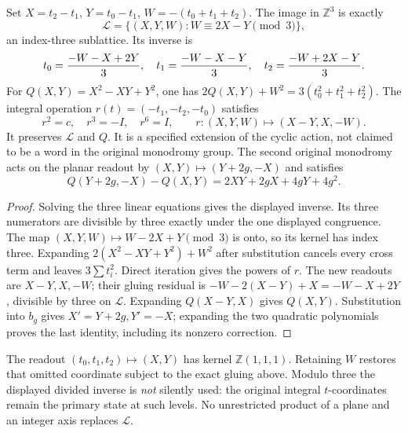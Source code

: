 \begin{proposition}
Set $X=t_2-t_1$, $Y=t_0-t_1$, $W=-(t_0+t_1+t_2)$. The image in
$\mathbb Z^3$ is exactly
\[
 \mathcal L=\{(X,Y,W):W\equiv2X-Y\pmod3\},
\]
an index-three sublattice. Its inverse is
\[
 t_0={-W-X+2Y\over3},\quad t_1={-W-X-Y\over3},\quad
 t_2={-W+2X-Y\over3}.
\]
For $Q(X,Y)=X^2-XY+Y^2$, one has
$2Q(X,Y)+W^2=3(t_0^2+t_1^2+t_2^2)$.
The integral operation $r(t)=(-t_1,-t_2,-t_0)$ satisfies
\[
 r^2=c,\quad r^3=-I,\quad r^6=I,\qquad
 r:(X,Y,W)\longmapsto(X-Y,X,-W).
\]
It preserves $\mathcal L$ and $Q$. It is a specified extension of the cyclic
action, not claimed to be a word in the original monodromy group.
The second original monodromy acts on the planar readout by
$(X,Y)\mapsto(Y+2g,-X)$ and satisfies
\[
 Q(Y+2g,-X)-Q(X,Y)=2XY+2gX+4gY+4g^2.
\]
\end{proposition}
\begin{proof}
Solving the three linear equations gives the displayed inverse. Its three
numerators are divisible by three exactly under the one displayed congruence.
The map $(X,Y,W)\mapsto W-2X+Y\pmod3$ is onto, so its kernel has index three.
Expanding $2(X^2-XY+Y^2)+W^2$ after substitution cancels every cross term
and leaves $3\sum t_i^2$. Direct iteration gives the powers of $r$.
The new readouts are $X-Y,X,-W$; their gluing residual is
$-W-2(X-Y)+X=-W-X+2Y$, divisible by three on $\mathcal L$.
Expanding $Q(X-Y,X)$ gives $Q(X,Y)$. Substitution into $b_g$ gives
$X'=Y+2g,Y'=-X$; expanding the two quadratic polynomials proves the last
identity, including its nonzero correction.
\end{proof}
The readout $(t_0,t_1,t_2)\mapsto(X,Y)$ has kernel
$\mathbb Z(1,1,1)$. Retaining $W$ restores that omitted coordinate subject
to the exact gluing above. Modulo three the displayed divided inverse is
\emph{not} silently used: the original integral $t$-coordinates remain the
primary state at such levels. No unrestricted product of a plane and an
integer axis replaces $\mathcal L$.

